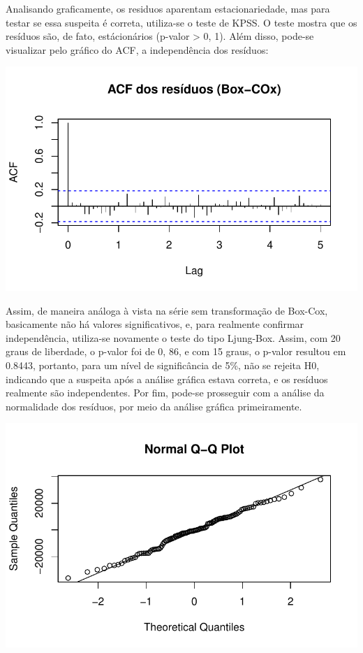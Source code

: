 \documentclass[
  letterpaper,
  DIV=11,
  numbers=noendperiod]{scrartcl}
\begin{document}
Analisando graficamente, os residuos aparentam estacionariedade, mas
para testar se essa suspeita é correta, utiliza-se o teste de KPSS. O
teste mostra que os resíduos são, de fato, estácionários (p-valor
\textgreater{} 0, 1). Além disso, pode-se visualizar pelo gráfico do
ACF, a independência dos resíduos:

\includegraphics{T2_grupo10_files/figure-pdf/unnamed-chunk-9-1.pdf}

Assim, de maneira análoga à vista na série sem transformação de Box-Cox,
basicamente não há valores significativos, e, para realmente confirmar
independência, utiliza-se novamente o teste do tipo Ljung-Box. Assim,
com 20 graus de liberdade, o p-valor foi de 0, 86, e com 15 graus, o
p-valor resultou em 0.8443, portanto, para um nível de significância de
5\%, não se rejeita H0, indicando que a suspeita após a análise gráfica
estava correta, e os resíduos realmente são independentes. Por fim,
pode-se prosseguir com a análise da normalidade dos resíduos, por meio
da análise gráfica primeiramente.

\includegraphics{T2_grupo10_files/figure-pdf/unnamed-chunk-10-1.pdf}
\end{document}
